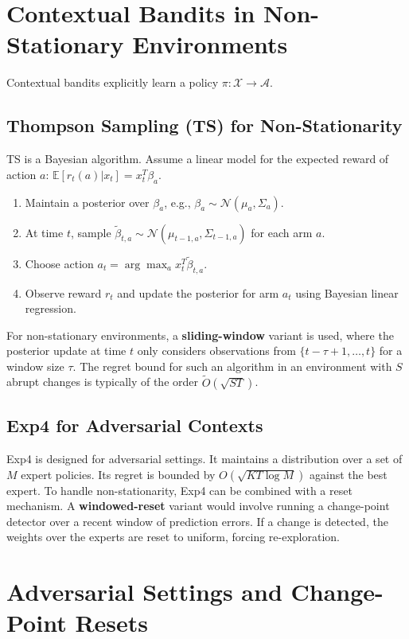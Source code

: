\documentclass{article}
\begin{document}
\section{Contextual Bandits in Non-Stationary Environments}
Contextual bandits explicitly learn a policy $\pi: \mathcal{X} \to \mathcal{A}$.

\subsection{Thompson Sampling (TS) for Non-Stationarity}
TS is a Bayesian algorithm. Assume a linear model for the expected reward of action $a$: $\mathbb{E}[r_t(a) | x_t] = x_t^T \beta_a$.
\begin{enumerate}
    \item Maintain a posterior over $\beta_a$, e.g., $\beta_a \sim \mathcal{N}(\mu_a, \Sigma_a)$.
    \item At time $t$, sample $\tilde{\beta}_{t,a} \sim \mathcal{N}(\mu_{t-1,a}, \Sigma_{t-1,a})$ for each arm $a$.
    \item Choose action $a_t = \arg\max_a x_t^T \tilde{\beta}_{t,a}$.
    \item Observe reward $r_t$ and update the posterior for arm $a_t$ using Bayesian linear regression.
\end{enumerate}
For non-stationary environments, a \textbf{sliding-window} variant is used, where the posterior update at time $t$ only considers observations from $\{t-\tau+1, \dots, t\}$ for a window size $\tau$. The regret bound for such an algorithm in an environment with $S$ abrupt changes is typically of the order $\tilde{O}(\sqrt{ST})$.

\subsection{Exp4 for Adversarial Contexts}
Exp4 is designed for adversarial settings. It maintains a distribution over a set of $M$ expert policies. Its regret is bounded by $O(\sqrt{KT \log M})$ against the best expert. To handle non-stationarity, Exp4 can be combined with a reset mechanism. A \textbf{windowed-reset} variant would involve running a change-point detector over a recent window of prediction errors. If a change is detected, the weights over the experts are reset to uniform, forcing re-exploration.

\section{Adversarial Settings and Change-Point Resets}
\end{document}
